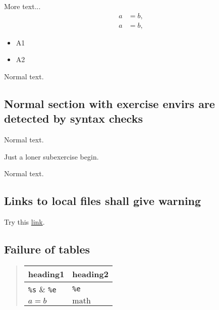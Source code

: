 \documentclass[%
oneside,                 %
final,                   %
10pt]{article}
\newcounter{doconce:movie:counter}
\begin{document}
More text...
\begin{align}
a &= b,  \label{eq1}\\
a &= b,  \label{eq2}
\end{align}

\begin{itemize}
 \item A1

 \item A2
\end{itemize}

\noindent
Normal text.

\subsection{Normal section with exercise envirs are detected by syntax checks}

Normal text.

Just a loner subexercise begin.

Normal text.

\subsection{Links to local files shall give warning}

Try this \href{{_static/doconce.py}}{link}.

\subsection{Failure of tables}


\begin{quote}
\begin{tabular}{ll}
\hline
\multicolumn{1}{c}{ heading1 } & \multicolumn{1}{c}{ heading2 } \\
\hline
\Verb!%
$a=b$     & $\mbox{math}$ \\
\hline
\end{tabular}
\end{quote}

\noindent


\cleardoublepage{}  %
\printindex
\end{document}
